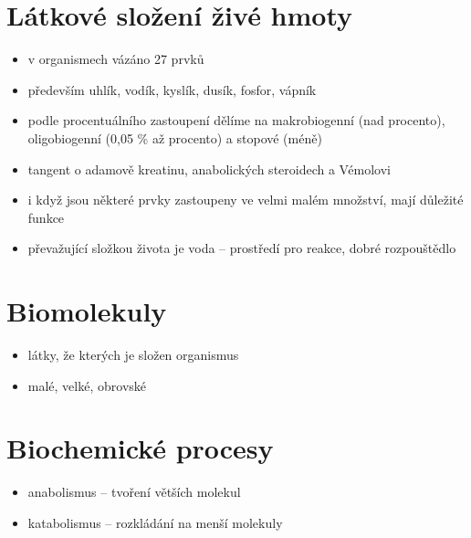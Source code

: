 \documentclass{article}
\begin{document}
\section{Látkové složení živé hmoty}
\begin{itemize}
  \item v organismech vázáno 27 prvků
  \item především uhlík, vodík, kyslík, dusík, fosfor, vápník
  \item podle procentuálního zastoupení dělíme na makrobiogenní (nad procento), oligobiogenní (0,05 \% až procento) a stopové (méně)
  \item tangent o adamově kreatinu, anabolických steroidech a Vémolovi
  \item i když jsou některé prvky zastoupeny ve velmi malém množství, mají důležité funkce
  \item převažující složkou života je voda -- prostředí pro reakce, dobré rozpouštědlo
\end{itemize}

\section{Biomolekuly}
\begin{itemize}
  \item látky, že kterých je složen organismus
  \item malé, velké, obrovské
\end{itemize}

\section{Biochemické procesy}
\begin{itemize}
  \item anabolismus -- tvoření větších molekul
  \item katabolismus -- rozkládání na menší molekuly
\end{itemize}
\end{document}
